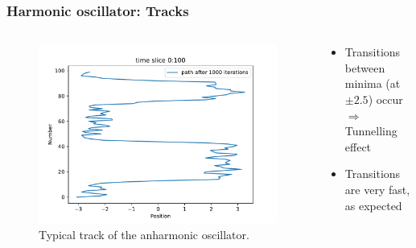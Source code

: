 \documentclass[aspectratio=169]{beamer}
\begin{document}
\begin{frame}
	\frametitle{Harmonic oscillator: Tracks}
	\vspace{-15px}
	\begin{columns}
		\begin{column}{0.6\textwidth}
			\begin{figure}[H]
				\centering
					\includegraphics[width=\textwidth]{../imgs/anharmonic_oscillator_track/track_100010005_track_pretty_1000.pdf}
				\caption{Typical track of the anharmonic oscillator.}
				\label{fig:anharmonic_oscillator_track_100010005_track_pretty_1000}
			\end{figure}
		\end{column}
		\begin{column}{0.39\textwidth}
			\begin{itemize}
				\item Transitions between minima (at $\pm 2.5$) occur
				\\ $\Rightarrow$ Tunnelling effect
				\item Transitions are very fast, as expected
			\end{itemize}
		\end{column}
	\end{columns}
\end{frame}
\end{document}
